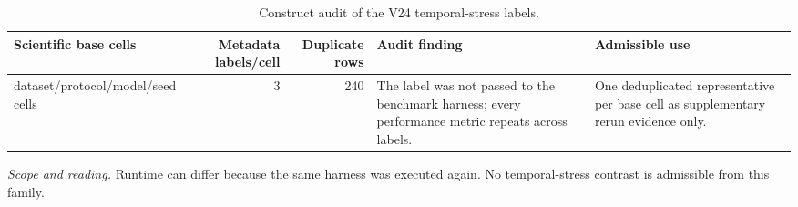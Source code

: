 \begin{table}[tbp]
\centering
\footnotesize
\setlength{\tabcolsep}{3.2pt}
\renewcommand{\arraystretch}{1.12}
\caption{Construct audit of the V24 temporal-stress labels.}
\label{tab:s-v24-audit}
\begin{tabularx}{\textwidth}{@{}>{\raggedright\arraybackslash}p{} r r Y >{\raggedright\arraybackslash}p{0.24\textwidth}@{}}
\toprule
\textbf{Scientific base cells} & \textbf{Metadata labels/cell} & \textbf{Duplicate rows} & \textbf{Audit finding} & \textbf{Admissible use} \\
 dataset/protocol/model/seed cells & 3 & 240 & The label was not passed to the benchmark harness; every performance metric repeats across labels. & One deduplicated representative per base cell as supplementary rerun evidence only. \\
\bottomrule
\end{tabularx}
\vspace{2pt}
\begin{minipage}{\textwidth}\footnotesize\emph{Scope and reading.} Runtime can differ because the same harness was executed again. No temporal-stress contrast is admissible from this family.\end{minipage}
\end{table}
